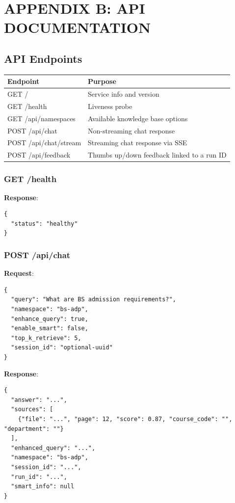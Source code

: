 \documentclass[12pt,a4paper]{book}
\numberwithin{table}{chapter}
\numberwithin{figure}{chapter}
\numberwithin{equation}{chapter}
\begin{document}
\chapter{APPENDIX B: API DOCUMENTATION}

\section{API Endpoints}

\begin{longtable}{|p{2in}|p{4in}|}
\hline
\textbf{Endpoint} & \textbf{Purpose}\\
\hline
GET / & Service info and version\\
\hline
GET /health & Liveness probe\\
\hline
GET /api/namespaces & Available knowledge base options\\
\hline
POST /api/chat & Non-streaming chat response\\
\hline
POST /api/chat/stream & Streaming chat response via SSE\\
\hline
POST /api/feedback & Thumbs up/down feedback linked to a run ID\\
\hline
\end{longtable}

\subsection{GET /health}
\textbf{Response}:
\begin{lstlisting}
{
  "status": "healthy"
}
\end{lstlisting}

\subsection{POST /api/chat}
\textbf{Request}:
\begin{lstlisting}
{
  "query": "What are BS admission requirements?",
  "namespace": "bs-adp",
  "enhance_query": true,
  "enable_smart": false,
  "top_k_retrieve": 5,
  "session_id": "optional-uuid"
}
\end{lstlisting}

\textbf{Response}:
\begin{lstlisting}
{
  "answer": "...",
  "sources": [
    {"file": "...", "page": 12, "score": 0.87, "course_code": "", "department": ""}
  ],
  "enhanced_query": "...",
  "namespace": "bs-adp",
  "session_id": "...",
  "run_id": "...",
  "smart_info": null
}
\end{lstlisting}
\end{document}
